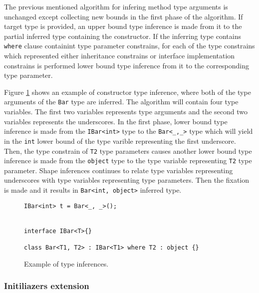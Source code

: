 The previous mentioned algorithm for infering method type arguments is unchanged except collecting new bounds in the first phase of the algorithm.
If target type is provided, an upper bound type inference is made from it to the partial inferred type containing the constructor.
If the inferring type contains \texttt{where} clause containint type parameter constrains, for each of the type constrains which represented either inheritance constrains or interface implementation constrains is performed lower bound type inference from it to the corresponding type parameter.
\par
Figure \ref{img62:ctro} shows an example of constructor type inference, where both of the type arguments of the \texttt{Bar} type are inferred.
The algorithm will contain four type variables. The first two variables represents type arguments and the second two variables represents the underscores.
In the first phase, lower bound type inference is made from the \texttt{IBar<int>} type to the \texttt{Bar<\_,\_>} type which will yield in the \texttt{int} lower bound of the type varible representing the first underscore.
Then, the type constrain of \texttt{T2} type parameters causes another lower bound type inference is made from the \texttt{object} type to the type variable representing \texttt{T2} type parameter.
Shape inferences continues to relate type variables representing underscores with type variables representing type parameters.
Then the fixation is made and it results in \texttt{Bar<int, object>} inferred type.
\begin{figure}[h!]
\begin{lstlisting}[style=csharp, mathescape=true]
IBar<int> t = Bar<_, _>();


interface IBar<T>{}

class Bar<T1, T2> : IBar<T1> where T2 : object {}
\end{lstlisting}
\caption{Example of type inferences.}
\label{img62:ctro}
\end{figure}

\subsubsection*{Initiliazers extension}

